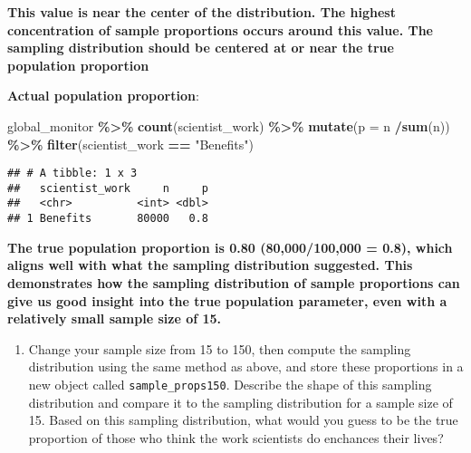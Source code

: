 \documentclass[
]{article}
\newenvironment{Shaded}{\begin{snugshade}}{\end{snugshade}}
\newcommand{\AttributeTok}[1]{\textcolor[rgb]{0.13,0.29,0.53}{#1}}
\newcommand{\FunctionTok}[1]{\textcolor[rgb]{0.13,0.29,0.53}{\textbf{#1}}}
\newcommand{\NormalTok}[1]{#1}
\newcommand{\SpecialCharTok}[1]{\textcolor[rgb]{0.81,0.36,0.00}{\textbf{#1}}}
\newcommand{\StringTok}[1]{\textcolor[rgb]{0.31,0.60,0.02}{#1}}
\providecommand{\tightlist}{%
  \setlength{\itemsep}{0pt}\setlength{\parskip}{0pt}}
\begin{document}
\textbf{This value is near the center of the distribution. The highest
concentration of sample proportions occurs around this value. The
sampling distribution should be centered at or near the true population
proportion}

\textbf{Actual population proportion}:

\begin{Shaded}
\begin{Highlighting}[]
\NormalTok{global\_monitor }\SpecialCharTok{\%\textgreater{}\%}
  \FunctionTok{count}\NormalTok{(scientist\_work) }\SpecialCharTok{\%\textgreater{}\%}
  \FunctionTok{mutate}\NormalTok{(}\AttributeTok{p =}\NormalTok{ n }\SpecialCharTok{/}\FunctionTok{sum}\NormalTok{(n)) }\SpecialCharTok{\%\textgreater{}\%}
  \FunctionTok{filter}\NormalTok{(scientist\_work }\SpecialCharTok{==} \StringTok{"Benefits"}\NormalTok{)}
\end{Highlighting}
\end{Shaded}

\begin{verbatim}
## # A tibble: 1 x 3
##   scientist_work     n     p
##   <chr>          <int> <dbl>
## 1 Benefits       80000   0.8
\end{verbatim}

\textbf{The true population proportion is 0.80 (80,000/100,000 = 0.8),
which aligns well with what the sampling distribution suggested. This
demonstrates how the sampling distribution of sample proportions can
give us good insight into the true population parameter, even with a
relatively small sample size of 15.}

\begin{enumerate}
\def\labelenumi{\arabic{enumi}.}
\setcounter{enumi}{8}
\tightlist
\item
  Change your sample size from 15 to 150, then compute the sampling
  distribution using the same method as above, and store these
  proportions in a new object called \texttt{sample\_props150}. Describe
  the shape of this sampling distribution and compare it to the sampling
  distribution for a sample size of 15. Based on this sampling
  distribution, what would you guess to be the true proportion of those
  who think the work scientists do enchances their lives?
\end{enumerate}
\end{document}
